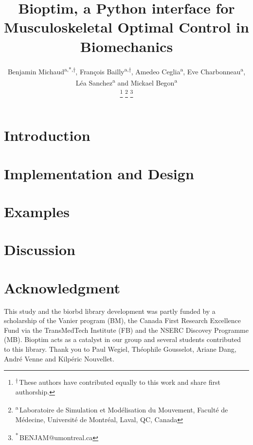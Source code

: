 \documentclass[letterpaper, 10 pt, conference]{ieeeconf}  %
\title{\LARGE \bf Bioptim, a Python interface for Musculoskeletal Optimal Control in Biomechanics}
\author{Benjamin Michaud\textsuperscript{a,*,$\dagger$}, François Bailly\textsuperscript{a,$\dagger$}, Amedeo Ceglia\textsuperscript{a}, Eve Charbonneau\textsuperscript{a}, Léa Sanchez\textsuperscript{a}  and  Mickael Begon\textsuperscript{a}%

\thanks{\textsuperscript{$\dagger$}\,These authors have contributed equally to this work and share first authorship.}
\thanks{\textsuperscript{a}\,Laboratoire de Simulation et Modélisation du Mouvement, Faculté de Médecine, Université de Montréal, Laval, QC, Canada}%
\thanks{\textsuperscript{*}\,BENJAM@umontreal.ca}
}
\begin{document}
\maketitle
\thispagestyle{plain}
\pagestyle{plain}



\section{Introduction}\label{sec:introduction}


\section{Implementation and Design}\label{sec:design&impl}


\section{Examples}\label{sec:Examples}


\section{Discussion}\label{sec:discussion}


\section*{Acknowledgment}
This study and the biorbd library development was partly funded by a scholarship of the  Vanier program (BM), the Canada First Research Excellence Fund via the TransMedTech Institute (FB) and the NSERC Discovey Programme (MB). 
Bioptim acts as a catalyst in our group and several students contributed to this library. 
Thank you to Paul Wegiel, Théophile Gousselot, Ariane Dang, André Venne and Kilpéric Nouvellet. 




\newpage
\label{sec:appendix}
\end{document}
